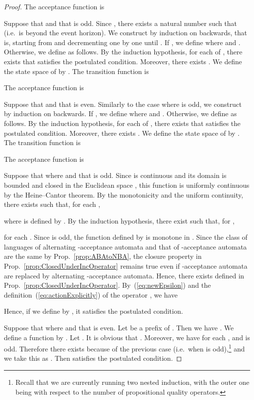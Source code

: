 \documentclass[a4paper,USenglish,numberwithinsect]{lipics}
\theoremstyle{definition}
\theoremstyle{remark}
\theoremstyle{plain}
\begin{document}
\begin{proof}
  The acceptance function  is


  Suppose that  and
 that  is odd. Since , there
 exists a natural number  such that
  (i.e.\
  is beyond the event
horizon). We construct  by induction
 on  backwards, that is, starting from  and
 decrementing  one by one until .
 If , we define  
  where  and 
  .
  Otherwise, we define 
 as follows. By the induction hypothesis, for each of , there exists  that satisfies the postulated condition. Moreover, there exists . We define the state space  of  by . The transition function  is

  The acceptance function  is


  Suppose that  and that  is even. Similarly to the case where  is odd, we construct  by induction on  backwards.
 If , we define  
  where  and 
  .
  Otherwise, we define 
 as follows. By the induction hypothesis, for each of , there exists  that satisfies the postulated condition. Moreover, there exists . We define the state space  of  by . The transition function  is

  The acceptance function  is


  Suppose that  where  and that  is odd. Since  is continuous and
 its domain  is bounded and closed in the Euclidean space , this function  is uniformly continuous by the Heine–Cantor theorem. By the monotonicity and the uniform continuity, there exists  such that, for each , 
  
  where  is defined by . By the  induction hypothesis, there exist  such that, for , 
  
  for each . Since  is
 odd, the function  defined by  is
 monotone in . Since the class of languages of alternating
 -acceptance automata and that of -acceptance automata are
 the same by Prop.~\ref{prop:ABAtoNBA}, the closure property in
 Prop.~\ref{prop:ClosedUnderIncOperator} remains true even if -acceptance automata are replaced by alternating -acceptance automata. Hence, there exists  defined in Prop.~\ref{prop:ClosedUnderIncOperator}. 
 By~(\ref{eq:newEpsilon}) and the definition~(\ref{eq:actionExplicitly}) of the operator , we have
  
 Hence, if we define  by
 , 
it
satisfies the postulated condition.
  
  Suppose that  where  and that  is even. Let  be a prefix of . Then we have
 . We
 define a function  by
 . Let . It is obvious that
 . Moreover, we have  for each
 , and  is odd. Therefore
 there exists  because of the
 previous case (i.e.\ when  is odd),\footnote{Recall that
 we are currently running two nested induction, with the outer one being with respect
 to the number of propositional quality operators.} 
and we take this as . Then  satisfies the postulated condition.
\end{proof}
\end{document}
